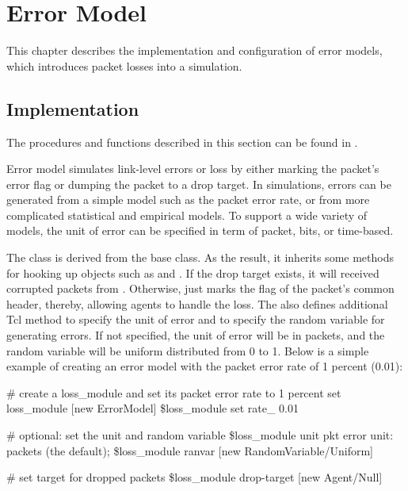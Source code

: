 %
%
\chapter{Error Model}
\label{chap:error_model}

This chapter describes the implementation and configuration of error
models, which introduces packet losses into a simulation. 

\section{Implementation}

The procedures and functions described in this section can be found in
.

Error model simulates link-level errors or loss by either marking the
packet's error flag or dumping the packet to a drop target.  In
simulations, errors can be generated from a simple model such as the
packet error rate, or from more complicated statistical and empirical models.
To support a wide variety of models, the unit of error can be specified
in term of packet, bits, or time-based.

The  class is derived from the  base
class.  As the result, it inherits some methods for hooking up objects
such as  and .  If the drop target
exists, it will received corrupted packets from .
Otherwise,  just marks the  flag of the
packet's common header, thereby, allowing agents to handle the loss.
The  also defines additional Tcl method  to
specify the unit of error and  to specify the random
variable for generating errors.  If not specified, the unit of error
will be in packets, and the random variable will be uniform distributed
from 0 to 1.  Below is a simple example of creating an error model with
the packet error rate of 1 percent (0.01):
\begin{program}
        # create a loss_module and set its packet error rate to 1 percent
        set loss_module [new ErrorModel]
        \$loss_module set rate_ 0.01

        # {\cf optional:  set the unit and random variable}
        \$loss_module unit pkt            \; error unit: packets (the default);
        \$loss_module ranvar [new RandomVariable/Uniform]

        # {\cf set target for dropped packets}
        \$loss_module drop-target [new Agent/Null]
\end{program}

